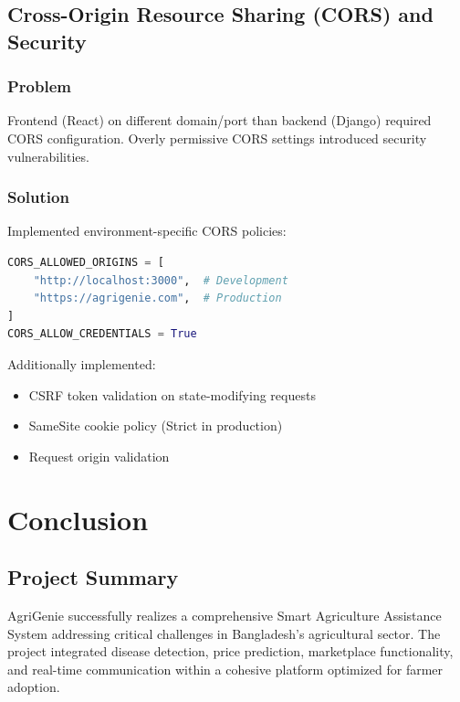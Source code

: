 \documentclass[12pt,a4paper]{report}
\begin{document}
\section{Cross-Origin Resource Sharing (CORS) and Security}

\subsection{Problem}

Frontend (React) on different domain/port than backend (Django) required CORS configuration. Overly permissive CORS settings introduced security vulnerabilities.

\subsection{Solution}

Implemented environment-specific CORS policies:

\begin{lstlisting}[language=Python]
CORS_ALLOWED_ORIGINS = [
    "http://localhost:3000",  # Development
    "https://agrigenie.com",  # Production
]
CORS_ALLOW_CREDENTIALS = True
\end{lstlisting}

Additionally implemented:
\begin{itemize}
    \item CSRF token validation on state-modifying requests
    \item SameSite cookie policy (Strict in production)
    \item Request origin validation
\end{itemize}

\newpage

\chapter{Conclusion}

\section{Project Summary}

AgriGenie successfully realizes a comprehensive Smart Agriculture Assistance System addressing critical challenges in Bangladesh's agricultural sector. The project integrated disease detection, price prediction, marketplace functionality, and real-time communication within a cohesive platform optimized for farmer adoption.
\end{document}
